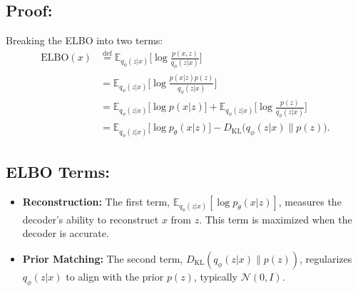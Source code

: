 \subsection*{Proof:}
Breaking the ELBO into two terms:
\begin{align*}
\text{ELBO}(x) &\overset{\text{def}}{=} \mathbb{E}_{q_\phi(z|x)} \big[ \log \frac{p(x, z)}{q_\phi(z|x)} \big] \\
&= \mathbb{E}_{q_\phi(z|x)} \big[ \log \frac{p(x|z)p(z)}{q_\phi(z|x)} \big] \\
&= \mathbb{E}_{q_\phi(z|x)} \big[ \log p(x|z) \big] + \mathbb{E}_{q_\phi(z|x)} \big[ \log \frac{p(z)}{q_\phi(z|x)} \big] \\
&= \mathbb{E}_{q_\phi(z|x)} \big[ \log p_\theta(x|z) \big] - D_{\text{KL}} \big( q_\phi(z|x) \| p(z) \big).
\end{align*}

\subsection*{ELBO Terms:}
\begin{itemize}
    \item \textbf{Reconstruction:} The first term, \(\mathbb{E}_{q_\phi(z|x)} [\log p_\theta(x|z)]\), measures the decoder's ability to reconstruct \(x\) from \(z\). This term is maximized when the decoder is accurate.
    \item \textbf{Prior Matching:} The second term, \(D_{\text{KL}}(q_\phi(z|x) \| p(z))\), regularizes \(q_\phi(z|x)\) to align with the prior \(p(z)\), typically \(\mathcal{N}(0, I)\).
\end{itemize}
